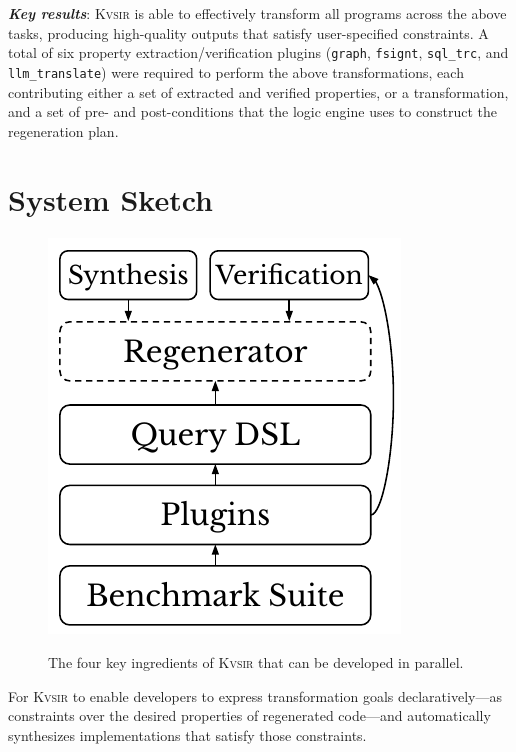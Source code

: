 \documentclass[sigplan,review,anonymous,10pt]{acmart}
\newcommand{\sys}{{\scshape Kv{\textalpha}sir}\xspace}
\newcommand{\heading}[1]{\vspace{2pt}\noindent\textbf{\emph{#1}}:\enspace}
\newcommand{\ttt}[1]{\texttt{#1}\xspace}
\begin{document}
\heading{Key results}
\sys is able to effectively transform all programs across the above tasks,
producing high-quality outputs that satisfy user-specified constraints.
A total
of six property extraction/verification plugins (\ttt{graph}, \ttt{fsignt}, \ttt{sql\_trc}, and \ttt{llm\_translate})
were required to perform the above transformations, each
contributing either a set of extracted and verified properties, or a
transformation, and a set of pre- and post-conditions that the logic engine
uses to construct the regeneration plan.

\section{System Sketch}
\label{sec:design}

\begin{figure}
  \includegraphics[width=.4\columnwidth]{figs/kvasir_levels.pdf}
  \label{fig:levels}
  \caption{The four key ingredients 
  of \sys that can be developed in parallel.}
\end{figure}
For \sys to enable developers
to express transformation goals declaratively---as constraints over the desired
properties of regenerated code---and automatically synthesizes implementations
that satisfy those constraints.


\end{document}
